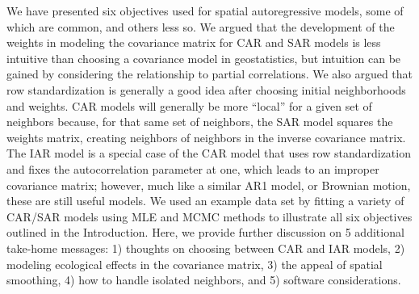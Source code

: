 \documentclass[11pt, titlepage]{article}\usepackage[]{graphicx}\usepackage[]{color}
\begin{document}
\begin{spacing}{1.9}
\begin{flushleft}
We have presented six objectives used for spatial autoregressive models, some of which are common, and others less so.  We argued that the development of the weights in modeling the covariance matrix for CAR and SAR models is less intuitive than choosing a covariance model in geostatistics, but intuition can be gained by considering the relationship to partial correlations.  We also argued that row standardization is generally a good idea after choosing initial neighborhoods and weights.  CAR models will generally be more ``local'' for a given set of neighbors because, for that same set of neighbors, the SAR model squares the weights matrix, creating neighbors of neighbors in the inverse covariance matrix. The IAR model is a special case of the CAR model that uses row standardization and fixes the autocorrelation parameter at one, which leads to an improper covariance matrix; however, much like a similar AR1 model, or Brownian motion, these are still useful models. We used an example data set by fitting a variety of CAR/SAR models using MLE and MCMC methods to illustrate all six objectives outlined in the Introduction.  Here, we provide further discussion on 5 additional take-home messages: 1) thoughts on choosing between CAR and IAR models, 2) modeling ecological effects in the covariance matrix, 3) the appeal of spatial smoothing, 4) how to handle isolated neighbors, and 5) software considerations.


\end{flushleft}
\end{spacing}
\end{document}
